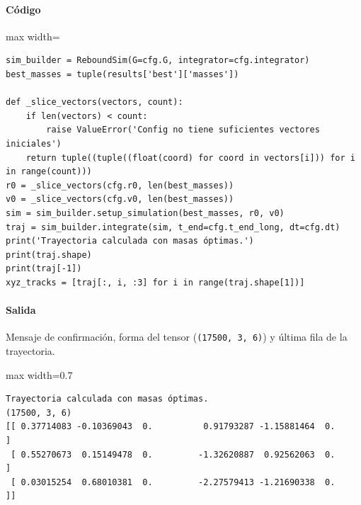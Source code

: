 \paragraph{Código}
\begin{listing}[H]
\caption{Celda 27: integración con $m^{\*}$}
\label{lst:c04_cell27}
\begin{adjustbox}{max width=\textwidth}
\begin{minipage}{\textwidth}
\begin{verbatim}
sim_builder = ReboundSim(G=cfg.G, integrator=cfg.integrator)
best_masses = tuple(results['best']['masses'])

def _slice_vectors(vectors, count):
    if len(vectors) < count:
        raise ValueError('Config no tiene suficientes vectores iniciales')
    return tuple((tuple((float(coord) for coord in vectors[i])) for i in range(count)))
r0 = _slice_vectors(cfg.r0, len(best_masses))
v0 = _slice_vectors(cfg.v0, len(best_masses))
sim = sim_builder.setup_simulation(best_masses, r0, v0)
traj = sim_builder.integrate(sim, t_end=cfg.t_end_long, dt=cfg.dt)
print('Trayectoria calculada con masas óptimas.')
print(traj.shape)
print(traj[-1])
xyz_tracks = [traj[:, i, :3] for i in range(traj.shape[1])]
\end{verbatim}
\end{minipage}
\end{adjustbox}
\end{listing}
\paragraph{Salida} Mensaje de confirmación, forma del tensor (\texttt{(17500, 3, 6)}) y última fila de la trayectoria. %

\begin{listing}[H]
\caption{Ejemplo Salida}
\begin{adjustbox}{max width=0.7\textwidth}
\begin{minipage}{\textwidth}
\begin{verbatim}
Trayectoria calculada con masas óptimas.
(17500, 3, 6)
[[ 0.37714083 -0.10369043  0.          0.91793287 -1.15881464  0.        ]
 [ 0.55270673  0.15149478  0.         -1.32620887  0.92562063  0.        ]
 [ 0.03015254  0.68010381  0.         -2.27579413 -1.21690338  0.        ]]
\end{verbatim}
\end{minipage}
\end{adjustbox}
\end{listing}

